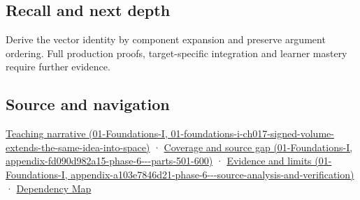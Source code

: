 \subsection{Recall and next depth}\label{appendix-5caa058bd9c7-recall-and-next-depth}

Derive the vector identity by component expansion and preserve argument ordering. Full production proofs, target-specific integration and learner mastery require further evidence.

\subsection{Source and navigation}\label{appendix-5caa058bd9c7-source-and-navigation}

\href{../01-Foundations-I/main.pdf\#nameddest=01-foundations-i-ch017-signed-volume-extends-the-same-idea-into-space}{Teaching narrative (01-Foundations-I, 01-foundations-i-ch017-signed-volume-extends-the-same-idea-into-space)} · \href{../01-Foundations-I/main.pdf\#nameddest=appendix-fd090d982a15-phase-6---parts-501-600}{Coverage and source gap (01-Foundations-I, appendix-fd090d982a15-phase-6-\/-\/-parts-501-600)} · \href{../01-Foundations-I/main.pdf\#nameddest=appendix-a103e7846d21-phase-6---source-analysis-and-verification}{Evidence and limits (01-Foundations-I, appendix-a103e7846d21-phase-6-\/-\/-source-analysis-and-verification)} · \hyperref[appendix-4ad47bdd269a]{Dependency Map}

